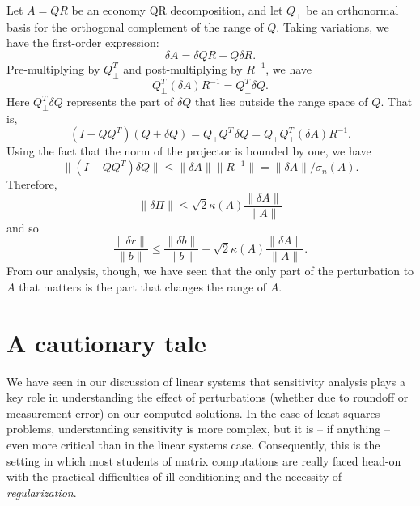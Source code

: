 \documentclass[12pt, leqno]{article} %
\begin{document}
Let $A = QR$ be an economy QR decomposition, and let $Q_\perp$ be an
orthonormal basis for the orthogonal complement of the range of $Q$.
Taking variations, we have the first-order expression:
\[
  \delta A = \delta Q R + Q \delta R.
\]
Pre-multiplying by $Q_\perp^T$ and post-multiplying by $R^{-1}$, we have
\[
  Q_\perp^T (\delta A) R^{-1} = Q_{\perp}^T \delta Q.
\]
Here $Q_{\perp}^T \delta Q$ represents the part of $\delta Q$ that
lies outside the range space of $Q$.  That is,
\[
  (I-QQ^T) (Q+\delta Q)
  = Q_\perp Q_\perp^T \delta Q
  = Q_\perp Q_\perp^T (\delta A) R^{-1}.
\]
Using the fact that the norm of the projector is bounded by one,
we have
\[
  \|(I-QQ^T) \delta Q\|
    \leq \|\delta A\| \|R^{-1}\|
    = \|\delta A\|/\sigma_n(A).
\]
Therefore,
\[
  \|\delta \Pi\| \leq \sqrt{2} \kappa(A) \frac{\|\delta A\|}{\|A\|}
\]
and so
\[
  \frac{\|\delta r\|}{\|b\|} \leq
  \frac{\|\delta b\|}{\|b\|} +
  \sqrt{2} \kappa(A) \frac{\|\delta A\|}{\|A\|}.
\]
From our analysis, though, we have seen that the only part of the
perturbation to $A$ that matters is the part that changes the range
of $A$.

\section{A cautionary tale}

We have seen in our discussion of linear systems that sensitivity
analysis plays a key role in understanding the effect of perturbations
(whether due to roundoff or measurement error) on our computed
solutions.  In the case of least squares problems, understanding
sensitivity is more complex, but it is -- if anything -- even more
critical than in the linear systems case.  Consequently, this is the
setting in which most students of matrix computations are really faced
head-on with the practical difficulties of ill-conditioning and the
necessity of {\em regularization}.
\end{document}
